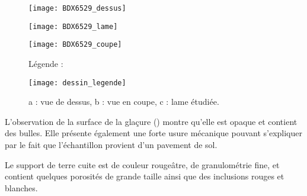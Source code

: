 \begin{figure}[htb]
  \begin{minipage}[t]{0.5\textwidth}
    \centerfloat
    \vspace*{0pt}
    \texttt{[image: BDX6529\_dessus]}
  \end{minipage}%
  \quad%
  \begin{minipage}[t]{0.5\textwidth}
    \centerfloat
    \vspace*{0pt}
    \texttt{[image: BDX6529\_lame]}
  \end{minipage}

  \bigskip

  \begin{minipage}[t]{0.5\textwidth}
    \centerfloat
    \vspace*{0pt}
    \texttt{[image: BDX6529\_coupe]}
  \end{minipage}%
  \quad%
  \begin{minipage}[t]{0.5\textwidth}
    \vspace*{0pt}
    Légende :

    \texttt{[image: dessin\_legende]}
  \end{minipage}
  \caption{\legendeB 
           a : vue de dessus, b : vue en coupe, c : lame étudiée.}
  \label{dessin:6529}
\end{figure}

L'observation de la surface de la glaçure () montre 
qu'elle est opaque et contient des bulles. Elle présente également 
une forte usure mécanique pouvant s'expliquer par le fait que 
l'échantillon provient d'un pavement de sol.

Le support de terre cuite est de couleur rougeâtre, de granulométrie 
fine, et contient quelques porosités de grande taille ainsi que des 
inclusions rouges et blanches.

